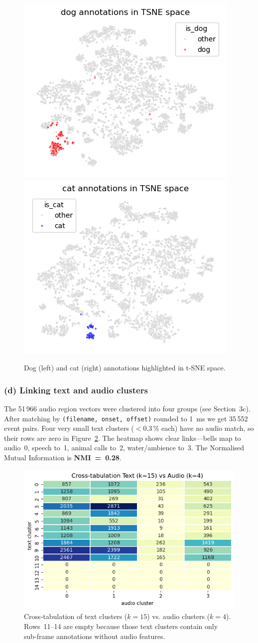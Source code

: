 \documentclass[runningheads]{llncs}
\begin{document}
\begin{figure}[h]
  \centering
  \includegraphics[width=.42\linewidth]{figs_tang/04_dog_annotations_in_tsne_space.png}\hfill
  \includegraphics[width=.42\linewidth]{figs_tang/04_cat_annotations_in_tsne_space.png}
  \caption{Dog (left) and cat (right) annotations highlighted in t‑SNE space.}
  \label{fig:dogcat_tsne}
\end{figure}

\subsubsection{(d) Linking text and audio clusters}
The 51\,966 audio region vectors were clustered into four groups (see Section~3c). After matching by \texttt{(filename, onset, offset)} rounded to 1 ms we get 35\,552 event pairs. Four very small text clusters ($<0.3$\,\% each) have no audio match, so their rows are zero in Figure~\ref{fig:text_audio_heat}. The heatmap shows clear links—bells map to audio 0, speech to 1, animal calls to 2, water/ambience to 3. The Normalised Mutual Information is \textbf{NMI = 0.28}.

\begin{figure}[h]
  \centering
  \includegraphics[width=.7\linewidth]{figs_tang/04_text_audio_heatmap_k15.png}
  \caption{Cross‑tabulation of text clusters ($k=15$) vs. audio clusters ($k=4$). Rows 11–14 are empty because those text clusters contain only sub‑frame annotations without audio features.}
  \label{fig:text_audio_heat}
\end{figure}
\end{document}
